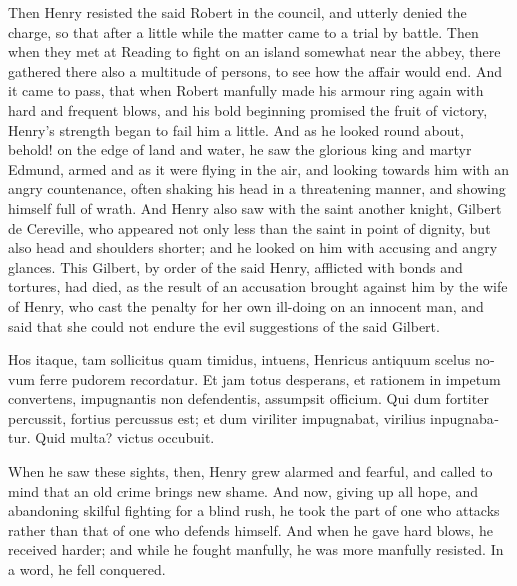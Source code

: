 \documentclass{book}
\begin{document}
\begin{paracol}{2}
\begin{otherlanguage}{latin}
\end{otherlanguage}

\switchcolumn

Then Henry resisted the said Robert in the council, and utterly denied the charge, so that after a little while the matter came to a trial by battle. Then when they met at Reading to fight on an island somewhat near the abbey, there gathered there also a multitude of persons, to see how the affair would end. And it came to pass, that when Robert manfully made his armour ring again with hard and frequent blows, and his bold beginning promised the fruit of victory, Henry's strength began to fail him a little. And as he looked round about, behold! on the edge of land and water, he saw the glorious king and martyr Edmund, armed and as it were flying in the air, and looking towards him with an angry countenance, often shaking his head in a threatening manner, and showing himself full of wrath. And Henry also saw with the saint another knight, Gilbert de Cereville, who appeared not only less than the saint in point of dignity, but also head and shoulders shorter; and he looked on him with accusing and angry glances. This Gilbert, by order of the said Henry, afflicted with bonds and tortures, had died, as the result of an accusation brought against him by the wife of Henry, who cast the penalty for her own ill-doing on an innocent man, and said that she could not endure the evil suggestions of the said Gilbert.

\switchcolumn*

\begin{otherlanguage}{latin}
Hos itaque, tam sollicitus quam timidus, intuens, Henricus antiquum scelus novum ferre pudorem recordatur. Et jam totus desperans, et rationem in impetum convertens, impugnantis non defendentis, assumpsit officium. Qui dum fortiter percussit, fortius percussus est; et dum viriliter impugnabat, virilius inpugnabatur. Quid multa? victus occubuit.
\end{otherlanguage}

\switchcolumn

When he saw these sights, then, Henry grew alarmed and fearful, and called to mind that an old crime brings new shame. And now, giving up all hope, and abandoning skilful fighting for a blind rush, he took the part of one who attacks rather than that of one who defends himself. And when he gave hard blows, he received harder; and while he fought manfully, he was more manfully resisted. In a word, he fell conquered.


\end{paracol}
\end{document}
